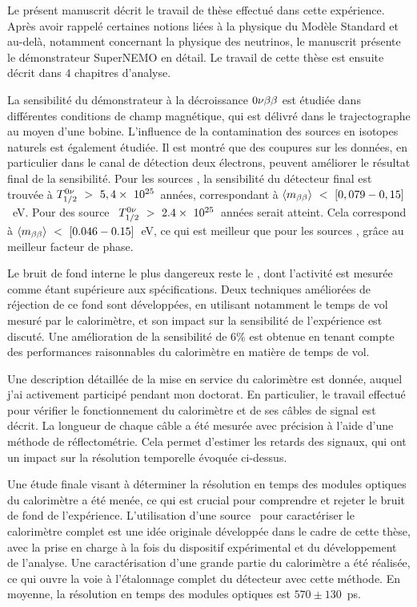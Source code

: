 \begin{mdframed}[linecolor=Prune,linewidth=1]
\begin{footnotesize}
\begin{multicols}{2}
Le présent manuscrit décrit le travail de thèse effectué dans cette expérience.
Après avoir rappelé certaines notions liées à la physique du Modèle Standard et au-delà, notamment concernant la physique des neutrinos, le manuscrit présente le démonstrateur SuperNEMO en détail.
Le travail de cette thèse est ensuite décrit dans $4$ chapitres d'analyse.

La sensibilité du démonstrateur à la décroissance $0\nu\beta\beta$ est étudiée dans différentes conditions de champ magnétique, qui est délivré dans le trajectographe au moyen d'une bobine.
L'influence de la contamination des sources en isotopes naturels est également étudiée.
Il est montré que des coupures sur les données, en particulier dans le canal de détection deux électrons, peuvent améliorer le résultat final de la sensibilité.
Pour les sources \Se, la sensibilité du détecteur final est trouvée à $T_{1/2}^{0\nu}~>~5,4\times~10^{25}$~années, correspondant à $\langle m_{\beta\beta}\rangle~<~[0,079-0,15]$~eV.
Pour des source \Nd\ $T_{1/2}^{0\nu}~>~2.4\times~10^{25}$~années serait atteint.
Cela correspond à $\langle m_{\beta\beta}\rangle~<~[0.046-0.15]$~eV, ce qui est meilleur que pour les sources \Se, grâce au meilleur facteur de phase.

Le bruit de fond interne le plus dangereux reste le \Tl, dont l'activité est mesurée comme étant supérieure aux spécifications.
Deux techniques améliorées de réjection de ce fond sont développées, en utilisant notamment le temps de vol mesuré par le calorimètre, et son impact sur la sensibilité de l'expérience est discuté.
Une amélioration de la sensibilité de $6$\% est obtenue en tenant compte des performances raisonnables du calorimètre en matière de temps de vol.

Une description détaillée de la mise en service du calorimètre est donnée, auquel j'ai activement participé pendant mon doctorat.
En particulier, le travail effectué pour vérifier le fonctionnement du calorimètre et de ses câbles de signal est décrit.
La longueur de chaque câble a été mesurée avec précision à l'aide d'une méthode de réflectométrie.
Cela permet d'estimer les retards des signaux, qui ont un impact sur la résolution temporelle évoquée ci-dessus.

Une étude finale visant à déterminer la résolution en temps des modules optiques du calorimètre a été menée, ce qui est crucial pour comprendre et rejeter le bruit de fond de l'expérience.
L'utilisation d'une source \Co\ pour caractériser le calorimètre complet est une idée originale développée dans le cadre de cette thèse, avec la prise en charge à la fois du dispositif expérimental et du développement de l'analyse.
Une caractérisation d'une grande partie du calorimètre a été réalisée, ce qui ouvre la voie à l'étalonnage complet du détecteur avec cette méthode.
En moyenne, la résolution en temps des modules optiques est $570\pm 130$~ps.

\end{multicols}
\end{footnotesize}
\end{mdframed}

